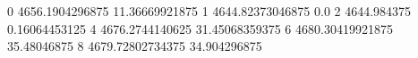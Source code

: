 0 4656.1904296875 11.36669921875
1 4644.82373046875 0.0
2 4644.984375 0.16064453125
4 4676.2744140625 31.45068359375
6 4680.30419921875 35.48046875
8 4679.72802734375 34.904296875
